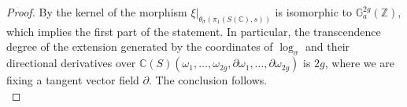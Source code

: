 \documentclass[10 pt,a4paper]{article}
\theoremstyle{plain}
\theoremstyle{definition}
\theoremstyle{named}
\newcommand{\bC}{\mathbb C}
\newcommand{\bZ}{\mathbb Z}
\begin{document}
\begin{proof}
    By  the kernel of the morphism $\xi|_{\theta_\sigma(\pi_1(S(\bC),s))}$ is isomorphic to $\mathbb{G}_a^{2g}(\bZ)$, which implies the first part of the statement. In particular, the transcendence degree of the extension generated by the coordinates of $\log_\sigma$ and their directional derivatives over $\bC(S)(\omega_1, \ldots, \omega_{2g}, \partial\omega_1, \ldots, \partial \omega_{2g})$ is $2g$, where we are fixing a tangent vector field $\partial$. The conclusion follows.\\
\end{proof}
\end{document}
